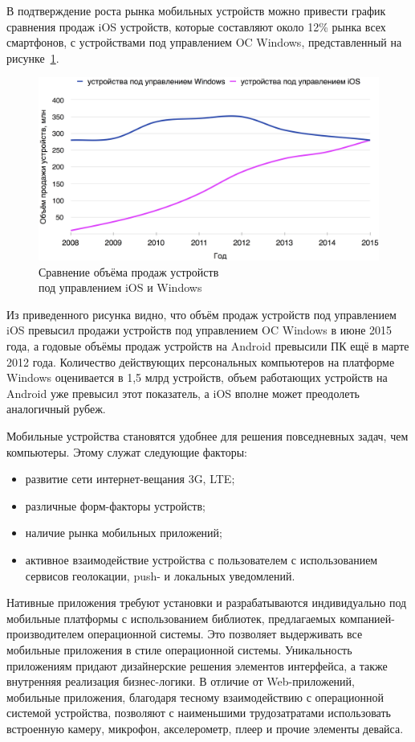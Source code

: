 В подтверждение роста рынка мобильных устройств можно привести график сравнения
продаж iOS устройств, которые составляют около 12\% рынка всех смартфонов,
с устройствами под управлением OC Windows, представленный
на рисунке~\ref{fig:ios_windows_compare}.

\begin{figure}[h!]
  \centering
  \includegraphics[width=150mm]{fig/ios_windows_compare}
  \caption{Сравнение объёма продаж устройств \\ под управлением iOS и Windows}
  \label{fig:ios_windows_compare}
\end{figure}

Из приведенного рисунка видно, что объём продаж устройств под управлением
iOS превысил продажи устройств под управлением OC Windows в июне 2015 года, а
годовые объёмы продаж устройств на Android превысили ПК ещё в марте 2012 года.
Количество действующих персональных компьютеров на платформе Windows оценивается
в 1,5 млрд устройств, объем работающих устройств на Android уже превысил этот
показатель, а iOS вполне может преодолеть аналогичный рубеж.

Мобильные устройства становятся удобнее для решения повседневных задач,
чем компьютеры. Этому служат следующие факторы:
\begin{itemize}
  \item развитие сети интернет-вещания 3G, LTE;
  \item различные форм-факторы устройств;
  \item наличие рынка мобильных приложений;
  \item активное взаимодействие устройства с пользователем с использованием сервисов
    геолокации, push- и локальных уведомлений.
\end{itemize}

Нативные приложения требуют установки и разрабатываются индивидуально
под мобильные платформы с использованием библиотек, предлагаемых
компанией-производителем операционной системы. Это позволяет выдерживать все
мобильные приложения в стиле операционной системы. Уникальность приложениям
придают дизайнерские решения элементов интерфейса, а также внутренняя реализация
бизнес-логики.
В отличие от Web-приложений, мобильные приложения, благодаря тесному
взаимодействию с операционной системой устройства, позволяют с наименьшими
трудозатратами использовать встроенную камеру, микрофон, акселерометр,
плеер и прочие элементы девайса.

